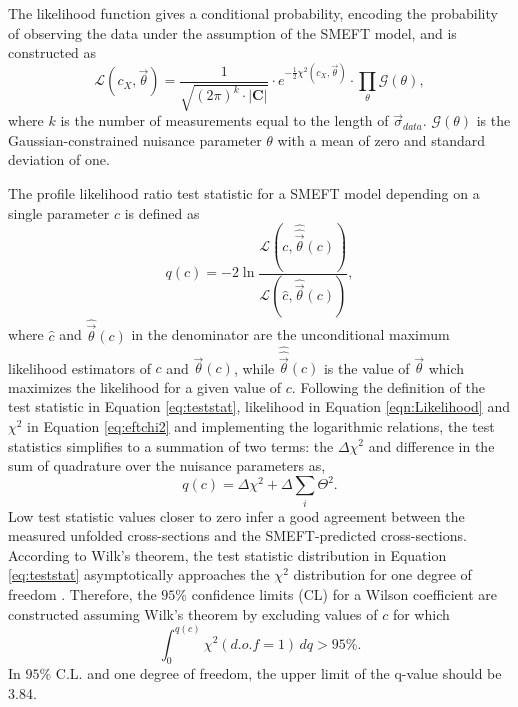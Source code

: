 The likelihood function gives a conditional probability, encoding the probability of observing the data under the assumption of the SMEFT model, and is constructed as 
\begin{equation}
    \mathcal{L}(c_X, \vec{\theta}) = \frac{1}{\sqrt{(2\pi)^k\cdot|\textbf{C}|}} \cdot e^{-\frac{1}{2}\chi^2(c_X, \vec{\theta})} \cdot \prod_{\theta}\mathcal{G}(\theta),
    \label{eqn:Likelihood}
\end{equation}
where $k$ is the number of measurements equal to the length of $\vec{\sigma}_{data}$. $\mathcal{G}(\theta)$ is the Gaussian-constrained nuisance parameter $\theta$ with a mean of zero and standard deviation of one. 

The profile likelihood ratio test statistic for a SMEFT model depending on a single parameter $c$ is defined as
\begin{equation}
    q(c) = -2 \ln \frac{\mathcal{L}(c, \hat{\hat{\vec{\theta}}}(c))}{\mathcal{L}(\hat{c}, \hat{\vec{\theta}}(c))},
\label{eq:teststat}
\end{equation}
where $\hat{c}$ and $\hat{\vec{\theta}}(c)$ in the denominator are the unconditional maximum likelihood estimators of $c$ and $\vec{\theta}(c)$, while $\hat{\hat{\vec{\theta}}}(c)$ is the value of $\vec{\theta}$ which maximizes the likelihood for a given value of $c$. Following the definition of the test statistic in Equation \ref{eq:teststat}, likelihood in Equation \ref{eqn:Likelihood} and $\chi^2$ in Equation \ref{eq:eftchi2} and implementing the logarithmic relations, the test statistics simplifies to a summation of two terms: the $\Delta \chi^2$ and difference in the sum of quadrature over the nuisance parameters as, 
\begin{equation}
    q(c) = \Delta \chi^2 + \Delta \sum_{i}{\Theta^2}.
    \label{eqn:SimplifiedTestStat}
\end{equation}
Low test statistic values closer to zero infer a good agreement between the measured unfolded cross-sections and the SMEFT-predicted cross-sections. According to Wilk's theorem, the test statistic distribution in Equation \ref{eq:teststat} asymptotically approaches the $\chi^2$ distribution for one degree of freedom \cite{WilksTheorem}. Therefore, the $95\%$ confidence limits (CL) for a Wilson coefficient are constructed assuming Wilk's theorem by excluding values of $c$ for which
\begin{equation}
    \int_{0}^{q(c)} \chi^2(d.o.f = 1) \, dq > 95 \%.
\label{eq:chi2cdf}
\end{equation}
In $95\%$ C.L. and one degree of freedom, the upper limit of the q-value should be 3.84. 

